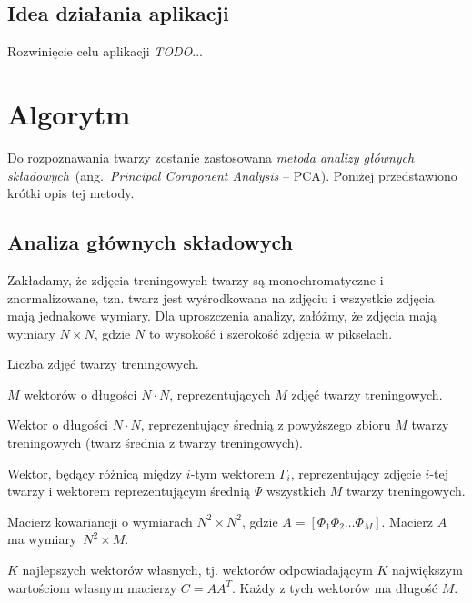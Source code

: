 \documentclass[a4paper,titlepage]{article}
\theoremstyle{break}
\begin{document}

\subsection{Idea działania aplikacji}

Rozwinięcie celu aplikacji \emph{TODO}...


\section{Algorytm}

Do rozpoznawania twarzy zostanie zastosowana \emph{metoda analizy głównych składowych}~(ang.~\emph{Principal Component Analysis} -- PCA). Poniżej przedstawiono krótki opis tej metody.


\subsection{Analiza głównych składowych}

Zakładamy, że zdjęcia treningowych twarzy są monochromatyczne i znormalizowane, tzn. twarz jest wyśrodkowana na zdjęciu i wszystkie zdjęcia mają jednakowe wymiary. Dla uproszczenia analizy, załóżmy, że zdjęcia mają wymiary $N\times N$, gdzie $N$ to wysokość i szerokość zdjęcia w pikselach.

\begin{description}[leftmargin=13em,style=nextline]
	\item[$M$] Liczba zdjęć twarzy treningowych.
	\item[$\Gamma_1, \Gamma_2, \dotsc, \Gamma_M$] $M$ wektorów o długości $N\cdot N$, reprezentujących $M$ zdjęć twarzy treningowych.
	\item[$\Psi = \frac{1}{M}\cdot\sum\limits_{n=1}^M\Gamma_n$] Wektor o długości $N\cdot N$, reprezentujący średnią z powyższego zbioru $M$ twarzy treningowych (twarz średnia z twarzy treningowych).
	\item[$\Phi_i=\Gamma_i-\Psi$] Wektor, będący różnicą między $i$-tym wektorem $\Gamma_i$, reprezentujący zdjęcie $i$-tej twarzy i wektorem reprezentującym średnią $\Psi$ wszystkich $M$ twarzy treningowych.
	\item[$C=\frac{1}{M}\cdot\sum\limits_{n=1}^M\Phi_n\Phi_n^T=AA^T$] Macierz kowariancji o wymiarach $N^2\times N^2$, gdzie $A=[\Phi_1\Phi_2\dotsc\Phi_M]$. Macierz $A$ ma wymiary~$N^2\times M$.
	\item[$u_1,u_2,\dotsc,u_K$] $K$ najlepszych wektorów własnych, tj. wektorów odpowiadającym $K$ największym wartościom własnym macierzy $C=AA^T$. Każdy z tych wektorów ma długość $M$.
\end{description}
\end{document}
